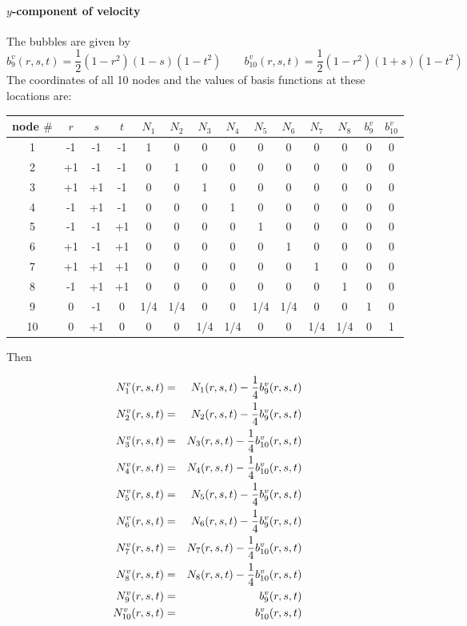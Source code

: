 \paragraph{$y$-component of velocity} 
The bubbles are given by 
\[
b_9^v(r,s,t)=\frac{1}{2}(1-r^2)(1-s)(1-t^2)
\qquad
b_{10}^v(r,s,t)=\frac{1}{2}(1-r^2)(1+s)(1-t^2)
\]
The coordinates of all 10 nodes and the values of basis functions at these locations are:
\begin{center}
\begin{tabular}{c|ccc|cccccccc|cc}
\hline
node $\#$  & $r$ & $s$ & $t$ & $N_1$ & $N_2$ & $N_3$ & $N_4$ & $N_5$ & $N_6$ & $N_7$ & $N_8$ & $b_9^v$ & $b_{10}^v$\\
\hline\hline
1 & -1 & -1 & -1 & 1 & 0 & 0 & 0 & 0 & 0 & 0 & 0 & 0 & 0\\
2 & +1 & -1 & -1 & 0 & 1 & 0 & 0 & 0 & 0 & 0 & 0 & 0 & 0\\
3 & +1 & +1 & -1 & 0 & 0 & 1 & 0 & 0 & 0 & 0 & 0 & 0 & 0\\
4 & -1 & +1 & -1 & 0 & 0 & 0 & 1 & 0 & 0 & 0 & 0 & 0 & 0\\
5 & -1 & -1 & +1 & 0 & 0 & 0 & 0 & 1 & 0 & 0 & 0 & 0 & 0\\
6 & +1 & -1 & +1 & 0 & 0 & 0 & 0 & 0 & 1 & 0 & 0 & 0 & 0\\
7 & +1 & +1 & +1 & 0 & 0 & 0 & 0 & 0 & 0 & 1 & 0 & 0 & 0\\
8 & -1 & +1 & +1 & 0 & 0 & 0 & 0 & 0 & 0 & 0 & 1 & 0 & 0\\
9 &  0 & -1 &  0 & 1/4 & 1/4 & 0 & 0 & 1/4 & 1/4 & 0 & 0 & 1& 0\\
10&  0 & +1 &  0 & 0 & 0 & 1/4 & 1/4 & 0 & 0 & 1/4 & 1/4 & 0& 1\\
\hline
\end{tabular}
\end{center}

Then

\begin{mdframed}[backgroundcolor=blue!5]
\begin{eqnarray}
{N}_1^v(r,s,t) &=&  N_1(r,s,t) - \frac{1}{4} b_9^v(r,s,t)\nonumber\\
{N}_2^v(r,s,t) &=&  N_2(r,s,t) - \frac{1}{4} b_9^v(r,s,t)\nonumber\\
{N}_3^v(r,s,t) &=&  N_3(r,s,t) - \frac{1}{4} b_{10}^v(r,s,t)\nonumber\\
{N}_4^v(r,s,t) &=&  N_4(r,s,t) - \frac{1}{4} b_{10}^v(r,s,t)\nonumber\\
{N}_5^v(r,s,t) &=&  N_5(r,s,t) - \frac{1}{4} b_9^v(r,s,t)\nonumber\\
{N}_6^v(r,s,t) &=&  N_6(r,s,t) - \frac{1}{4} b_9^v(r,s,t)\nonumber\\
{N}_7^v(r,s,t) &=&  N_7(r,s,t) - \frac{1}{4} b_{10}^v(r,s,t)\nonumber\\
{N}_8^v(r,s,t) &=&  N_8(r,s,t) - \frac{1}{4} b_{10}^v(r,s,t)\nonumber\\
{N}_9^v(r,s,t) &=&  b_9^v(r,s,t)\nonumber\\
{N}_{10}^v(r,s,t) &=&  b_{10}^v(r,s,t)
\end{eqnarray}
\end{mdframed}

